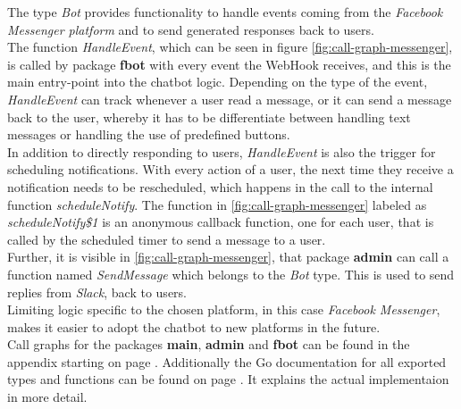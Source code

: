 The type \emph{Bot} provides functionality to handle events coming from the \emph{Facebook Messenger platform}
and to send generated responses back to users.
\\
The function \emph{HandleEvent}, which can be seen in figure \ref{fig:call-graph-messenger},
is called by package \textbf{fbot} with every event the WebHook receives,
and this is the main entry-point into the chatbot logic.
Depending on the type of the event,
\emph{HandleEvent} can track whenever a user read a message,
or it can send a message back to the user,
whereby it has to be differentiate between handling text messages
or handling the use of predefined buttons.
\\

In addition to directly responding to users,
\emph{HandleEvent} is also the trigger for scheduling notifications.
With every action of a user, the next time they receive a notification needs to be rescheduled,
which happens in the call to the internal function \emph{scheduleNotify}.
The function in \ref{fig:call-graph-messenger} labeled as \emph{scheduleNotify\$1} is an anonymous callback function,
one for each user, that is called by the scheduled timer to send a message to a user.
\\

Further, it is visible in \ref{fig:call-graph-messenger},
that package \textbf{admin} can call a function named \emph{SendMessage} which belongs to the \emph{Bot} type.
This is used to send replies from \emph{Slack}, back to users.
\\

Limiting logic specific to the chosen platform, in this case \emph{Facebook Messenger},
makes it easier to adopt the chatbot to new platforms in the future.
\\

Call graphs for the packages \textbf{main}, \textbf{admin} and \textbf{fbot} can be found in the appendix starting on page \pageref{a:call-graph}.
Additionally the Go documentation for all exported types and functions can be found on page \pageref{a:docs}.
It explains the actual implementaion in more detail.
